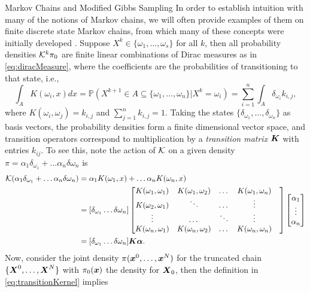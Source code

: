 \begin{chapter}{Markov Chains and Modified Gibbs Sampling}
In order to establish intuition with many of the notions of Markov chains, we will often provide examples of them on finite discrete state Markov chains, from which many of these concepts were initially developed \citep{billingsley2008probability}.
Suppose $X^k \in \{\omega_1,\dots,\omega_s\}$ for all $k$, then all probability densities $\mathcal K^k \pi_0$ are finite linear combinations of Dirac measures as in \eqref{eq:diracMeasure}, where the coefficients are the probabilities of transitioning to that state, i.e.,
\begin{equation}
  \int_A K(\omega_i,x)dx = \mathbb P( X^{k+1} \in A \subseteq \{\omega_1,\dots,\omega_n\}| X^k = \omega_{i} ) = \sum_{i=1}^n \int_A \delta_{\omega_i}k_{i,j},
\end{equation}
where $K(\omega_i,\omega_j) = k_{i,j}$ and $\sum_{j=1}^n k_{i,j} = 1$.
Taking the states $\{\delta_{\omega_1},\dots,\delta_{\omega_n}\}$ as basis vectors, the probability densities form a finite dimensional vector space, and transition operators correspond to multiplication by a \emph{transition matrix} $\mbox{\boldmath$K$}$ with entries $k_{ij}$.
To see this, note the action of $\mathcal K$ on a given density $\pi = \alpha_1\delta_{\omega_1} + \dots \alpha_n\delta{\omega_n}$ is
\begin{align}
  \mathcal K (\alpha_1\delta_{\omega_1} + \dots \alpha_n\delta{\omega_n})
    &= \alpha_1K(\omega_1,x) + \dots \alpha_nK(\omega_n,x)\nonumber\\
    &= [\delta_{\omega_1}\dots \delta{\omega_n}]
    \begin{bmatrix}
      K(\omega_1,\omega_1) & K(\omega_1,\omega_2) & \dots & K(\omega_1,\omega_n)\\
      K(\omega_2,\omega_1) & \ddots & \dots & \vdots &\\
      \vdots & \dots & \ddots & \vdots &\\
      K(\omega_n,\omega_1) & K(\omega_n,\omega_2) & \dots & K(\omega_n,\omega_n)\\
    \end{bmatrix}
    \begin{bmatrix}
      \alpha_1\\
      \vdots\\
      \alpha_n
    \end{bmatrix}\nonumber\\
    &= [\delta_{\omega_1}\dots \delta{\omega_n}]\mbox{\boldmath$K$}\mbox{\boldmath$\alpha$}.
\end{align}
Now, consider the joint density $\pi(\mbox{\boldmath$x$}^0,\dots,\mbox{\boldmath$x$}^N)$ for the truncated chain $\{\mbox{\boldmath$X$}^0,\dots,\mbox{\boldmath$X$}^N\}$ with $\pi_0(\mbox{\boldmath$x$})$ the density for $\mbox{\boldmath$X$}_0$, then the definition in \eqref{eq:transitionKernel} implies

\end{chapter}
